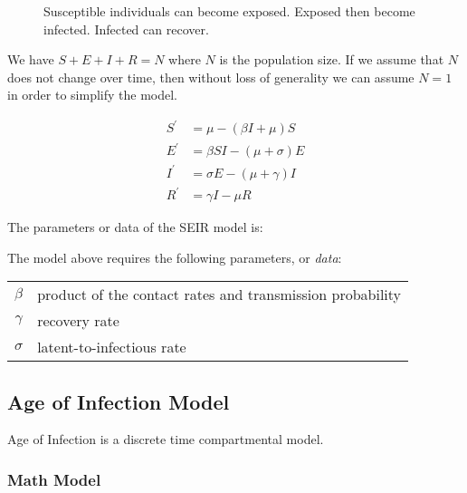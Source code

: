 \documentclass[11pt,a4paper,titlepage]{article}
\newcommand*{\dt}[1]{\ensuremath{#1^{\prime}}}%
\theoremstyle{definition}
\begin{document}
\begin{figure}
    \caption{
        \label{fig:compartment-flow-seir}
        Susceptible individuals can become exposed.
        Exposed then become infected.
        Infected can recover.
    }
\end{figure}

We have $S + E + I + R = N$ where $N$ is the population size.
If we assume that $N$ does not change over time,
then without loss of generality we can assume $N=1$ in order to simplify the model.

\begin{align}
    \dt{S} & = \mu - (\beta I + \mu) S \\%
    \dt{E} & = \beta S I - (\mu + \sigma) E \\%
    \dt{I} & = \sigma E - (\mu + \gamma) I \\%
    \dt{R} & = \gamma I - \mu R %
\end{align}

The parameters or data of the SEIR model is:

The model above requires the following parameters,
or \textit{data}:

\begin{tabular}{cl}
    $\beta$ & product of the contact rates and transmission probability\\%
    $\gamma$ & recovery rate \\%
    $\sigma$ & latent-to-infectious rate
\end{tabular}

\subsection{Age of Infection Model}
\label{subsec:infectious-disease-models:aoi}

Age of Infection is a discrete time compartmental model.

\subsubsection{Math Model}
\end{document}
